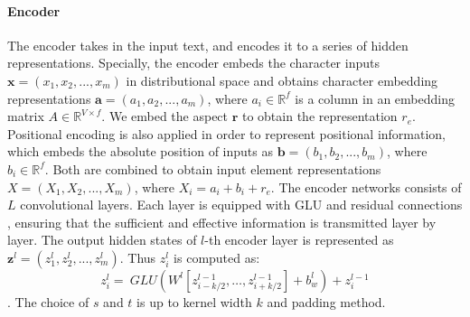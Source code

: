 \paragraph{Encoder}
The encoder takes in the input text, and encodes it to a series of hidden 
representations.
Specially, the encoder embeds the character inputs 
$\textbf{x} = (x_{1},x_{2},...,x_{m})$ in distributional space
and obtains character embedding representations $\textbf{a} = (a_1, a_2, ..., a_m)$, 
where $a_i \in \mathbb{R}^f$ is a column in
an embedding matrix $A \in \mathbb{R}^{V\times f}$.
We embed the aspect $\mathbf{ r }$ to obtain the representation $r_e$.
Positional encoding is also applied in order to represent positional information,
which embeds the absolute position of inputs as $\textbf{b} = (b_1, b_2, ..., b_m)$,
where $b_i \in \mathbb{ R }^f$.
Both are combined to obtain input element representations $X = 
(X_1, X_2, ..., X_m)$, where $X_i = a_i+b_i+r_e$.
The encoder networks consists of $L$ convolutional layers.
Each layer is equipped with GLU \cite{DauphinFAG17} and residual connections \cite{HeZRS16},
ensuring that the sufficient and effective information is transmitted layer by layer.  
The output hidden states of $l$-th encoder layer is represented as 
$\textbf{z}^l = (z^l_1, z^l_2, ..., z^l_m)$.
Thus $z^l_i$ is computed as:
\begin{equation}
z _ { i } ^ { l } = ~ GLU \left( W ^ { l } \left[ z _ {i-k/2 } ^ { l - 1 } , \ldots , z _ { i+k/2 } ^ { l - 1 } \right] + b _ { w } ^ { l } \right)  + z _ { i } ^ { l - 1 }
\end{equation}
.
The choice of $s$ and $t$ is up to kernel width $k$ and padding method.

